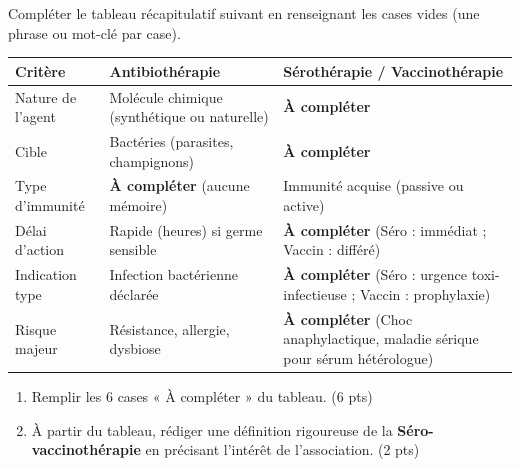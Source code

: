 \documentclass[11pt]{article}
\renewcommand{\arraystretch}{1.25}
\begin{document}
\begin{exercice}
Compléter le tableau récapitulatif suivant en renseignant les cases vides (une phrase ou mot-clé par case).

\begin{center}
\renewcommand{\arraystretch}{1.5}
\begin{tabular}{|p{2.5cm}|p{4.5cm}|p{4.5cm}|}
\hline
\textbf{Critère} & \textbf{Antibiothérapie} & \textbf{Sérothérapie / Vaccinothérapie} \\
\hline
Nature de l'agent & Molécule chimique (synthétique ou naturelle) & \textbf{À compléter} \\
\hline
Cible & Bactéries (parasites, champignons) & \textbf{À compléter} \\
\hline
Type d'immunité & \textbf{À compléter} (aucune mémoire) & Immunité acquise (passive ou active) \\
\hline
Délai d'action & Rapide (heures) si germe sensible & \textbf{À compléter} (Séro : immédiat ; Vaccin : différé) \\
\hline
Indication type & Infection bactérienne déclarée & \textbf{À compléter} (Séro : urgence toxi-infectieuse ; Vaccin : prophylaxie) \\
\hline
Risque majeur & Résistance, allergie, dysbiose & \textbf{À compléter} (Choc anaphylactique, maladie sérique pour sérum hétérologue) \\
\hline
\end{tabular}
\end{center}

\begin{enumerate}
    \item Remplir les 6 cases « À compléter » du tableau. (6 pts)
    \item À partir du tableau, rédiger une définition rigoureuse de la \textbf{Séro-vaccinothérapie} en précisant l'intérêt de l'association. (2 pts)
\end{enumerate}
\end{exercice}
\end{document}
